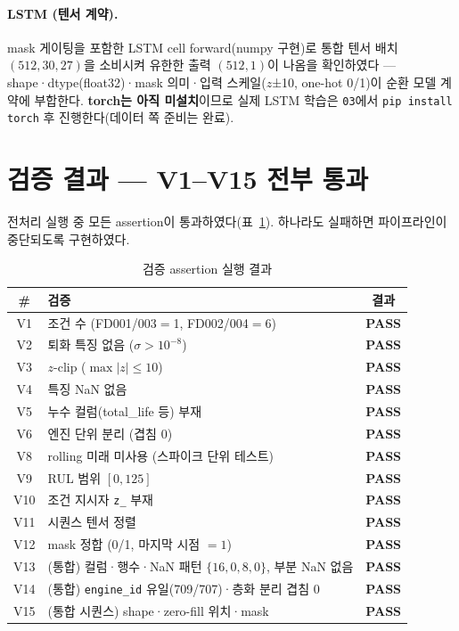\documentclass[11pt]{article}
\newcommand{\pass}{\textcolor{green!55!black}{\textbf{PASS}}}
\begin{document}
\paragraph{LSTM (텐서 계약).}
mask 게이팅을 포함한 LSTM cell forward(numpy 구현)로 통합 텐서 배치 $(512, 30, 27)$을 소비시켜
유한한 출력 $(512,1)$이 나옴을 확인하였다 — shape·dtype(float32)·mask 의미·입력 스케일($z$±10, one-hot 0/1)이 순환 모델 계약에 부합한다.
\textbf{torch는 아직 미설치}이므로 실제 LSTM 학습은 \texttt{03}에서 \texttt{pip install torch} 후 진행한다(데이터 쪽 준비는 완료).

\section{검증 결과 — V1--V15 전부 통과}

전처리 실행 중 모든 assertion이 통과하였다(표~\ref{tab:v}). 하나라도 실패하면 파이프라인이 중단되도록 구현하였다.

\begin{table}[H]
\centering
\caption{검증 assertion 실행 결과}
\label{tab:v}
\begin{tabular}{clc}
\toprule
\# & 검증 & 결과 \\
\midrule
V1 & 조건 수 (FD001/003$=$1, FD002/004$=$6) & \pass \\
V2 & 퇴화 특징 없음 ($\sigma>10^{-8}$) & \pass \\
V3 & $z$-clip ($\max|z|\le10$) & \pass \\
V4 & 특징 NaN 없음 & \pass \\
V5 & 누수 컬럼(total\_life 등) 부재 & \pass \\
V6 & 엔진 단위 분리 (겹침 0) & \pass \\
V8 & rolling 미래 미사용 (스파이크 단위 테스트) & \pass \\
V9 & RUL 범위 $[0,125]$ & \pass \\
V10 & 조건 지시자 \texttt{z\_} 부재 & \pass \\
V11 & 시퀀스 텐서 정렬 & \pass \\
V12 & mask 정합 (0/1, 마지막 시점 $=1$) & \pass \\
V13 & (통합) 컬럼·행수·NaN 패턴 $\{16,0,8,0\}$, 부분 NaN 없음 & \pass \\
V14 & (통합) \texttt{engine\_id} 유일(709/707)·층화 분리 겹침 0 & \pass \\
V15 & (통합 시퀀스) shape·zero-fill 위치·mask & \pass \\
\bottomrule
\end{tabular}
\end{table}
\end{document}
